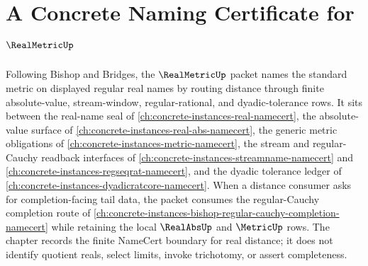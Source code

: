 \chapter{A Concrete Naming Certificate for $\RealMetricUp$}
\label{ch:concrete-instances-real-metric-namecert}

Following Bishop and Bridges, the $\RealMetricUp$ packet names the standard metric on displayed regular real names by routing distance through finite absolute-value, stream-window, regular-rational, and dyadic-tolerance rows. It sits between the real-name seal of \autoref{ch:concrete-instances-real-namecert}, the absolute-value surface of \autoref{ch:concrete-instances-real-abs-namecert}, the generic metric obligations of \autoref{ch:concrete-instances-metric-namecert}, the stream and regular-Cauchy readback interfaces of \autoref{ch:concrete-instances-streamname-namecert} and \autoref{ch:concrete-instances-regseqrat-namecert}, and the dyadic tolerance ledger of \autoref{ch:concrete-instances-dyadicratcore-namecert}. When a distance consumer asks for completion-facing tail data, the packet consumes the regular-Cauchy completion route of \autoref{ch:concrete-instances-bishop-regular-cauchy-completion-namecert} while retaining the local $\RealAbsUp$ and $\MetricUp$ rows. The chapter records the finite NameCert boundary for real distance; it does not identify quotient reals, select limits, invoke trichotomy, or assert completeness.

